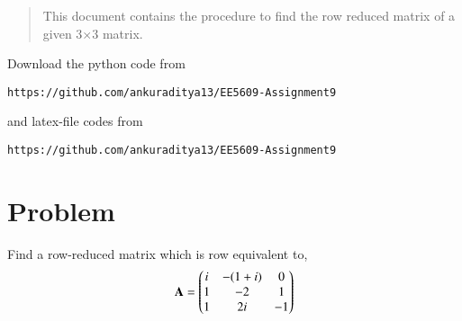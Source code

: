 \documentclass[journal,12pt,twocolumn]{IEEEtran}
\begin{document}
\begin{abstract}
This document contains the procedure to find the row reduced matrix of a given 3$\times$3 matrix. 
\end{abstract}
Download the python code from 
\begin{lstlisting}
https://github.com/ankuraditya13/EE5609-Assignment9
\end{lstlisting}
%
and latex-file codes from 
%
\begin{lstlisting}
https://github.com/ankuraditya13/EE5609-Assignment9
\end{lstlisting}

\section{Problem}
Find a row-reduced matrix which is row equivalent to,
\begin{align}
\mathbf{A} = \begin{pmatrix}i&-(1+i)&0\\1&-2&1\\1&2i&-1\end{pmatrix}
\label{A}
\end{align}
\end{document}
